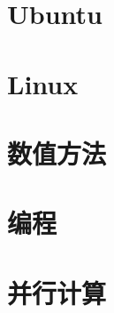 \documentclass[cn,11pt,chinese,twoside]{elegantbook}
\begin{document}
\part{Ubuntu}


\part{Linux}






\part{数值方法}


\part{编程}



\part{并行计算}

\end{document}
